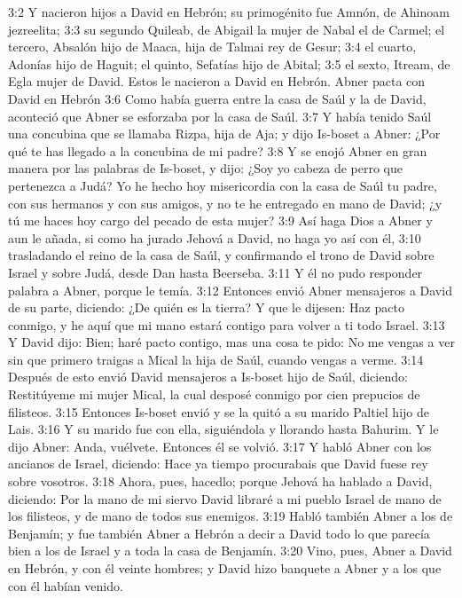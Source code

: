 3:2 Y nacieron hijos a David en Hebrón; su primogénito fue Amnón, de Ahinoam jezreelita;  
3:3 su segundo Quileab, de Abigail la mujer de Nabal el de Carmel; el tercero, Absalón hijo de Maaca, hija de Talmai rey de Gesur;  
3:4 el cuarto, Adonías hijo de Haguit; el quinto, Sefatías hijo de Abital;  
3:5 el sexto, Itream, de Egla mujer de David. Estos le nacieron a David en Hebrón.  
Abner pacta con David en Hebrón  
3:6 Como había guerra entre la casa de Saúl y la de David, aconteció que Abner se esforzaba por la casa de Saúl.  
3:7 Y había tenido Saúl una concubina que se llamaba Rizpa, hija de Aja; y dijo Is-boset a Abner: ¿Por qué te has llegado a la concubina de mi padre?  
3:8 Y se enojó Abner en gran manera por las palabras de Is-boset, y dijo: ¿Soy yo cabeza de perro que pertenezca a Judá? Yo he hecho hoy misericordia con la casa de Saúl tu padre, con sus hermanos y con sus amigos, y no te he entregado en mano de David; ¿y tú me haces hoy cargo del pecado de esta mujer?  
3:9 Así haga Dios a Abner y aun le añada, si como ha jurado Jehová a David, no haga yo así con él,  
3:10 trasladando el reino de la casa de Saúl, y confirmando el trono de David sobre Israel y sobre Judá, desde Dan hasta Beerseba.  
3:11 Y él no pudo responder palabra a Abner, porque le temía.  
3:12 Entonces envió Abner mensajeros a David de su parte, diciendo: ¿De quién es la tierra? Y que le dijesen: Haz pacto conmigo, y he aquí que mi mano estará contigo para volver a ti todo Israel.  
3:13 Y David dijo: Bien; haré pacto contigo, mas una cosa te pido: No me vengas a ver sin que primero traigas a Mical la hija de Saúl, cuando vengas a verme.  
3:14 Después de esto envió David mensajeros a Is-boset hijo de Saúl, diciendo: Restitúyeme mi mujer Mical, la cual desposé conmigo por cien prepucios de filisteos. 
3:15 Entonces Is-boset envió y se la quitó a su marido Paltiel hijo de Lais.  
3:16 Y su marido fue con ella, siguiéndola y llorando hasta Bahurim. Y le dijo Abner: Anda, vuélvete. Entonces él se volvió.  
3:17 Y habló Abner con los ancianos de Israel, diciendo: Hace ya tiempo procurabais que David fuese rey sobre vosotros.  
3:18 Ahora, pues, hacedlo; porque Jehová ha hablado a David, diciendo: Por la mano de mi siervo David libraré a mi pueblo Israel de mano de los filisteos, y de mano de todos sus enemigos. 
3:19 Habló también Abner a los de Benjamín; y fue también Abner a Hebrón a decir a David todo lo que parecía bien a los de Israel y a toda la casa de Benjamín.  
3:20 Vino, pues, Abner a David en Hebrón, y con él veinte hombres; y David hizo banquete a Abner y a los que con él habían venido.  
